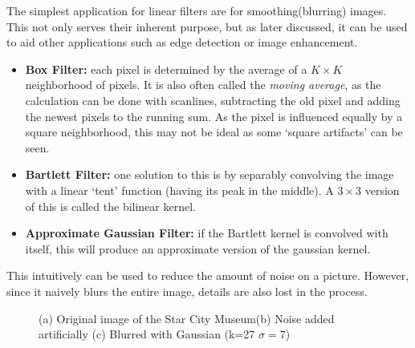 \documentclass[twoside,a4paper,article]{combine}
\begin{document}
The simplest application for linear filters are for smoothing(blurring) images. This not only serves their inherent purpose, but as later discussed, it can be used to aid other applications such as
edge detection or image enhancement.
\begin{itemize}
    \item \textbf{Box Filter:} each pixel is determined by the average of a $K \times K$ 
        neighborhood of pixels. It is also often called the \emph{moving average}, as the calculation can be done with scanlines, subtracting the
        old pixel and adding the newest pixels to the running sum. As the pixel is influenced equally by a square neighborhood, this may not be ideal as some `square artifacts' can be seen.
    \item \textbf{Bartlett Filter:} one solution to this is by separably convolving the image
        with a linear `tent' function (having its peak in the middle). A $3\times 3$ version of this is called the bilinear kernel.
    \item \textbf{Approximate Gaussian Filter:} if the Bartlett kernel is convolved with itself, this will produce an approximate version of the gaussian kernel.
\end{itemize}

This intuitively can be used to reduce the amount of noise on a picture. However, since it naively blurs the entire image,
details are also lost in the process.\\
\begin{minipage}{\textwidth}\begin{figure}[H]
    \captionsetup{justification=centering}
    \centering
    \caption{(a) Original image of the Star City Museum\cite{NASA_on_The_Commons_14}(b) Noise added artificially (c) Blurred with Gaussian (k=27 $\sigma=7$)}
    \label{fig:noise}
\end{figure}\end{minipage}
\end{document}
